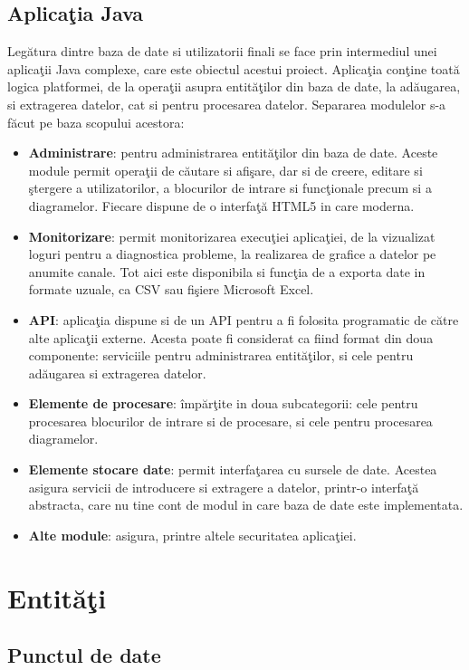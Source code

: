 \subsection{Aplicaţia Java}
Legătura dintre baza de date si utilizatorii finali se face prin intermediul unei aplicaţii Java complexe, care este obiectul acestui proiect. Aplicaţia conţine toată logica platformei, de la operaţii asupra entităţilor din baza de date, la adăugarea, si extragerea datelor, cat si pentru procesarea datelor. 
Separarea modulelor s-a făcut pe baza scopului acestora:
\begin{itemize}
	\item \textbf{Administrare}: pentru administrarea entităţilor din baza de date. Aceste module permit operaţii de căutare si afişare, dar si de creere, editare si ştergere a utilizatorilor, a blocurilor de intrare si funcţionale precum si a diagramelor. Fiecare dispune de o interfaţă HTML5 in care moderna. 
	\item \textbf{Monitorizare}: permit monitorizarea execuţiei aplicaţiei, de la vizualizat loguri pentru a diagnostica probleme, la realizarea de grafice a datelor pe anumite canale. Tot aici este disponibila si funcţia de a exporta date in formate uzuale, ca CSV sau fişiere Microsoft Excel.
	\item \textbf{API}: aplicaţia dispune si de un API pentru a fi folosita programatic de către alte aplicaţii externe. Acesta poate fi considerat ca fiind format din doua componente: serviciile pentru administrarea entităţilor, si cele pentru adăugarea si extragerea datelor.
	\item \textbf{Elemente de procesare}: împărţite in doua subcategorii: cele pentru procesarea blocurilor de intrare si de procesare, si cele pentru procesarea diagramelor.
	\item \textbf{Elemente stocare date}: permit interfaţarea cu sursele de date. Acestea asigura servicii de introducere si extragere a datelor, printr-o interfaţă abstracta, care nu tine cont de modul in care baza de date este implementata.
	\item \textbf{Alte module}: asigura, printre altele securitatea aplicaţiei.
\end{itemize}

\section{Entităţi}
\subsection{Punctul de date}

